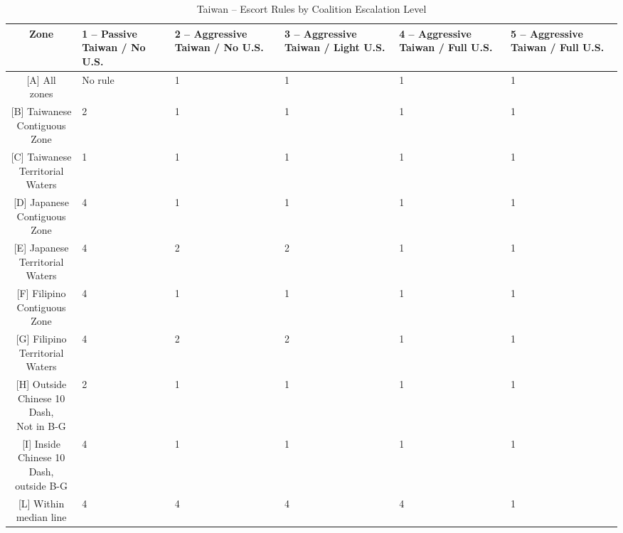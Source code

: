 \documentclass{article}
\begin{document}
\begin{table}[H]
\centering
\begin{tabularx}{\textwidth}{|c|X|X|X|X|X|}
\hline
\textbf{Zone} & \textbf{1 -- Passive Taiwan / No U.S.} & \textbf{2 -- Aggressive Taiwan / No U.S.} & \textbf{3 -- Aggressive Taiwan / Light U.S.} & \textbf{4 -- Aggressive Taiwan / Full U.S.} & \textbf{5 -- Aggressive Taiwan / Full U.S.} \\ 
\hline
\makecell{[A] All \\ zones} & No rule & 1 & 1 & 1 & 1 \\ 
\hline
\makecell{[B] Taiwanese \\ Contiguous Zone} & 2 & 1 & 1 & 1 & 1 \\ 
\hline
\makecell{[C] Taiwanese \\ Territorial Waters} & 1 & 1 & 1 & 1 & 1 \\ 
\hline
\makecell{[D] Japanese \\ Contiguous Zone} & 4 & 1 & 1 & 1 & 1 \\ 
\hline
\makecell{[E] Japanese \\ Territorial Waters} & 4 & 2 & 2 & 1 & 1 \\ 
\hline
\makecell{[F] Filipino \\ Contiguous Zone} & 4 & 1 & 1 & 1 & 1 \\ 
\hline
\makecell{[G] Filipino \\ Territorial Waters} & 4 & 2 & 2 & 1 & 1 \\ 
\hline
\makecell{[H] Outside \\ Chinese 10 Dash, \\ Not in B-G} & 2 & 1 & 1 & 1 & 1 \\ 
\hline
\makecell{[I] Inside \\ Chinese 10 Dash, \\ outside B-G} & 4 & 1 & 1 & 1 & 1 \\ 
\hline
\makecell{[L] Within \\ median line} & 4 & 4 & 4 & 4 & 1 \\ 
\hline
\end{tabularx}
\caption{Taiwan -- Escort Rules by Coalition Escalation Level}
\end{table}
\end{document}
